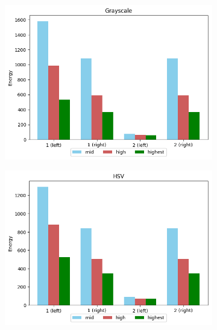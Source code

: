 \begin{figure}[H]
    \caption{Airplane STFT approach with Flattop window for Grayscale (a) and HSV (b) colourspaces.}
    \centering
    \begin{subfigure}{.5\textwidth}
        \centering
        \includegraphics[scale=0.41]{images/appendix/stft/airplane/flattop_Grayscale.png}
        \caption{}
    \end{subfigure}%
    \begin{subfigure}{.5\textwidth}
         \centering
          \includegraphics[scale=0.41]{images/appendix/stft/airplane/flattop_HSV.png}
          \caption{}
    \end{subfigure}
    \fautor
\end{figure}

